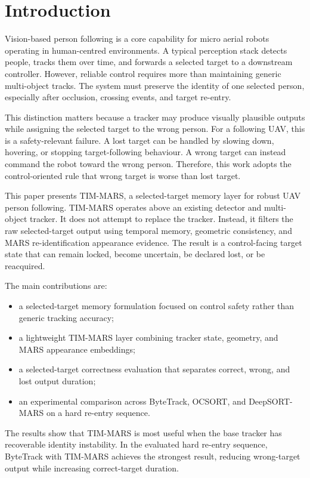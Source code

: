 \section{Introduction}

Vision-based person following is a core capability for micro aerial robots operating in human-centred environments. A typical perception stack detects people, tracks them over time, and forwards a selected target to a downstream controller. However, reliable control requires more than maintaining generic multi-object tracks. The system must preserve the identity of one selected person, especially after occlusion, crossing events, and target re-entry.

This distinction matters because a tracker may produce visually plausible outputs while assigning the selected target to the wrong person. For a following UAV, this is a safety-relevant failure. A lost target can be handled by slowing down, hovering, or stopping target-following behaviour. A wrong target can instead command the robot toward the wrong person. Therefore, this work adopts the control-oriented rule that wrong target is worse than lost target.

This paper presents TIM-MARS, a selected-target memory layer for robust UAV person following. TIM-MARS operates above an existing detector and multi-object tracker. It does not attempt to replace the tracker. Instead, it filters the raw selected-target output using temporal memory, geometric consistency, and MARS re-identification appearance evidence. The result is a control-facing target state that can remain locked, become uncertain, be declared lost, or be reacquired.

The main contributions are:

\begin{itemize}
    \item a selected-target memory formulation focused on control safety rather than generic tracking accuracy;
    \item a lightweight TIM-MARS layer combining tracker state, geometry, and MARS appearance embeddings;
    \item a selected-target correctness evaluation that separates correct, wrong, and lost output duration;
    \item an experimental comparison across ByteTrack, OCSORT, and DeepSORT-MARS on a hard re-entry sequence.
\end{itemize}

The results show that TIM-MARS is most useful when the base tracker has recoverable identity instability. In the evaluated hard re-entry sequence, ByteTrack with TIM-MARS achieves the strongest result, reducing wrong-target output while increasing correct-target duration.
